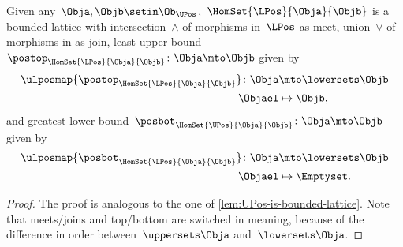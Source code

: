 \begin{lemma}
    \label{lem:LPos-is-bounded-lattice}
    Given any~$\Obja,\Objb\setin \Ob_\UPos$,~$\HomSet{\LPos}{\Obja}{\Objb}$ is a bounded lattice with intersection~$\wedge$ of morphisms in~$\LPos$ as meet, union~$\vee$ of morphisms in \LPos as join, least upper bound~$\postop_{\HomSet{\LPos}{\Obja}{\Objb}}\colon \Obja \mto \Objb$ given by
    \begin{equation}
        \begin{aligned}
            \ulposmap{\postop_{\HomSet{\LPos}{\Obja}{\Objb}}}\colon \Obja & \mto \lowersets \Objb \\
            \Objael                                                       & \mapsto \Objb,
        \end{aligned}
    \end{equation}
    and greatest lower bound~$\posbot_{\HomSet{\UPos}{\Obja}{\Objb}}\colon \Obja \mto \Objb$ given by
    \begin{equation}
        \begin{aligned}
            \ulposmap{\posbot_{\HomSet{\LPos}{\Obja}{\Objb}}}\colon \Obja & \mto \lowersets \Objb \\
            \Objael                                                       & \mapsto \Emptyset.
        \end{aligned}
    \end{equation}
\end{lemma}
\begin{proof}
    The proof is analogous to the one of \cref{lem:UPos-is-bounded-lattice}.
    Note that meets/joins and top/bottom are switched in meaning, because of the difference in order between~$\uppersets \Obja$ and~$\lowersets \Obja$.
\end{proof}

